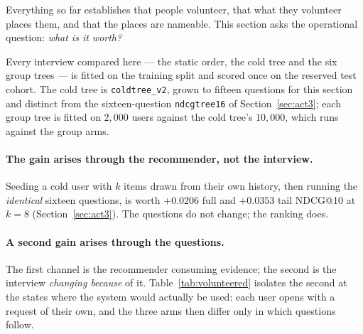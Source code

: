 \documentclass[11pt]{article}
\begin{document}
Everything so far establishes that people volunteer, that what they volunteer places them, and that
the places are nameable. This section asks the operational question: \emph{what is it worth?}

Every interview compared here --- the static order, the cold tree and the six group trees --- is
fitted on the training split and scored once on the reserved test cohort. The cold tree is
\texttt{coldtree\_v2}, grown to fifteen questions for this section and distinct from the sixteen-question
\texttt{ndcgtree16} of Section~\ref{sec:act3}; each group tree is fitted on $2{,}000$ users against
the cold tree's $10{,}000$, which runs against the group arms.

\paragraph{The gain arises through the recommender, not the interview.}
Seeding a cold user with $k$ items drawn from their own history, then running the \emph{identical}
sixteen questions, is worth $+0.0206$ full and $+0.0353$ tail NDCG@10 at $k{=}8$
(Section~\ref{sec:act3}). The questions do not change; the ranking does.

\paragraph{A second gain arises through the questions.}
The first channel is the recommender consuming evidence; the second is the interview \emph{changing
because} of it. Table~\ref{tab:volunteered} isolates the second at the states where the system would
actually be used: each user opens with a request of their own, and the three arms then differ only in
which questions follow.
\end{document}

